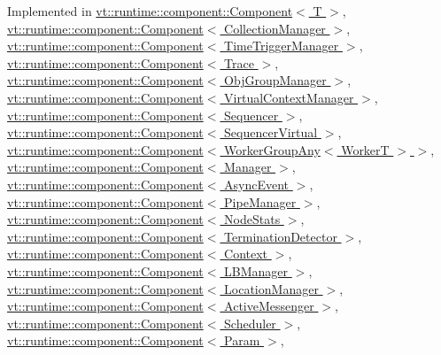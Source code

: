 Implemented in \hyperlink{structvt_1_1runtime_1_1component_1_1_component_adaf8bd995d4c91702e2ff7806ad9e695}{vt\+::runtime\+::component\+::\+Component$<$ T $>$}, \hyperlink{structvt_1_1runtime_1_1component_1_1_component_adaf8bd995d4c91702e2ff7806ad9e695}{vt\+::runtime\+::component\+::\+Component$<$ Collection\+Manager $>$}, \hyperlink{structvt_1_1runtime_1_1component_1_1_component_adaf8bd995d4c91702e2ff7806ad9e695}{vt\+::runtime\+::component\+::\+Component$<$ Time\+Trigger\+Manager $>$}, \hyperlink{structvt_1_1runtime_1_1component_1_1_component_adaf8bd995d4c91702e2ff7806ad9e695}{vt\+::runtime\+::component\+::\+Component$<$ Trace $>$}, \hyperlink{structvt_1_1runtime_1_1component_1_1_component_adaf8bd995d4c91702e2ff7806ad9e695}{vt\+::runtime\+::component\+::\+Component$<$ Obj\+Group\+Manager $>$}, \hyperlink{structvt_1_1runtime_1_1component_1_1_component_adaf8bd995d4c91702e2ff7806ad9e695}{vt\+::runtime\+::component\+::\+Component$<$ Virtual\+Context\+Manager $>$}, \hyperlink{structvt_1_1runtime_1_1component_1_1_component_adaf8bd995d4c91702e2ff7806ad9e695}{vt\+::runtime\+::component\+::\+Component$<$ Sequencer $>$}, \hyperlink{structvt_1_1runtime_1_1component_1_1_component_adaf8bd995d4c91702e2ff7806ad9e695}{vt\+::runtime\+::component\+::\+Component$<$ Sequencer\+Virtual $>$}, \hyperlink{structvt_1_1runtime_1_1component_1_1_component_adaf8bd995d4c91702e2ff7806ad9e695}{vt\+::runtime\+::component\+::\+Component$<$ Worker\+Group\+Any$<$ Worker\+T $>$ $>$}, \hyperlink{structvt_1_1runtime_1_1component_1_1_component_adaf8bd995d4c91702e2ff7806ad9e695}{vt\+::runtime\+::component\+::\+Component$<$ Manager $>$}, \hyperlink{structvt_1_1runtime_1_1component_1_1_component_adaf8bd995d4c91702e2ff7806ad9e695}{vt\+::runtime\+::component\+::\+Component$<$ Async\+Event $>$}, \hyperlink{structvt_1_1runtime_1_1component_1_1_component_adaf8bd995d4c91702e2ff7806ad9e695}{vt\+::runtime\+::component\+::\+Component$<$ Pipe\+Manager $>$}, \hyperlink{structvt_1_1runtime_1_1component_1_1_component_adaf8bd995d4c91702e2ff7806ad9e695}{vt\+::runtime\+::component\+::\+Component$<$ Node\+Stats $>$}, \hyperlink{structvt_1_1runtime_1_1component_1_1_component_adaf8bd995d4c91702e2ff7806ad9e695}{vt\+::runtime\+::component\+::\+Component$<$ Termination\+Detector $>$}, \hyperlink{structvt_1_1runtime_1_1component_1_1_component_adaf8bd995d4c91702e2ff7806ad9e695}{vt\+::runtime\+::component\+::\+Component$<$ Context $>$}, \hyperlink{structvt_1_1runtime_1_1component_1_1_component_adaf8bd995d4c91702e2ff7806ad9e695}{vt\+::runtime\+::component\+::\+Component$<$ L\+B\+Manager $>$}, \hyperlink{structvt_1_1runtime_1_1component_1_1_component_adaf8bd995d4c91702e2ff7806ad9e695}{vt\+::runtime\+::component\+::\+Component$<$ Location\+Manager $>$}, \hyperlink{structvt_1_1runtime_1_1component_1_1_component_adaf8bd995d4c91702e2ff7806ad9e695}{vt\+::runtime\+::component\+::\+Component$<$ Active\+Messenger $>$}, \hyperlink{structvt_1_1runtime_1_1component_1_1_component_adaf8bd995d4c91702e2ff7806ad9e695}{vt\+::runtime\+::component\+::\+Component$<$ Scheduler $>$}, \hyperlink{structvt_1_1runtime_1_1component_1_1_component_adaf8bd995d4c91702e2ff7806ad9e695}{vt\+::runtime\+::component\+::\+Component$<$ Param $>$}, 